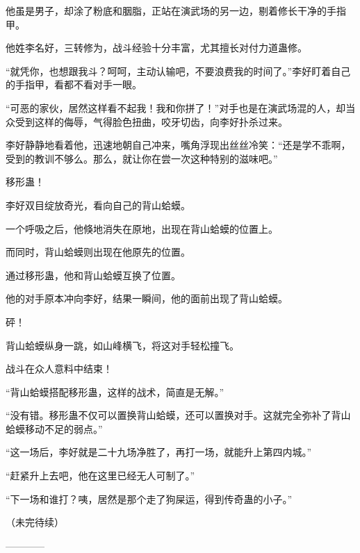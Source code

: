\begin{this_body}
他虽是男子，却涂了粉底和胭脂，正站在演武场的另一边，剔着修长干净的手指甲。

他姓李名好，三转修为，战斗经验十分丰富，尤其擅长对付力道蛊修。

“就凭你，也想跟我斗？呵呵，主动认输吧，不要浪费我的时间了。”李好盯着自己的手指甲，看都不看对手一眼。

“可恶的家伙，居然这样看不起我！我和你拼了！”对手也是在演武场混的人，却当众受到这样的侮辱，气得脸色扭曲，咬牙切齿，向李好扑杀过来。

李好静静地看着他，迅速地朝自己冲来，嘴角浮现出丝丝冷笑：“还是学不乖啊，受到的教训不够么。那么，就让你在尝一次这种特别的滋味吧。”

移形蛊！

李好双目绽放奇光，看向自己的背山蛤蟆。

一个呼吸之后，他倏地消失在原地，出现在背山蛤蟆的位置上。

而同时，背山蛤蟆则出现在他原先的位置。

通过移形蛊，他和背山蛤蟆互换了位置。

他的对手原本冲向李好，结果一瞬间，他的面前出现了背山蛤蟆。

砰！

背山蛤蟆纵身一跳，如山峰横飞，将这对手轻松撞飞。

战斗在众人意料中结束！

“背山蛤蟆搭配移形蛊，这样的战术，简直是无解。”

“没有错。移形蛊不仅可以置换背山蛤蟆，还可以置换对手。这就完全弥补了背山蛤蟆移动不足的弱点。”

“这一场后，李好就是二十九场净胜了，再打一场，就能升上第四内城。”

“赶紧升上去吧，他在这里已经无人可制了。”

“下一场和谁打？咦，居然是那个走了狗屎运，得到传奇蛊的小子。”

（未完待续）

------------

\end{this_body}

